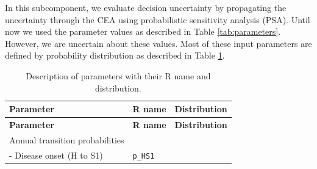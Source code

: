 \documentclass[]{book}
\begin{document}
In this subcomponent, we evaluate decision uncertainty by propagating
the uncertainty through the CEA using probabilistic sensitivity analysis
(PSA). Until now we used the parameter values as described in Table
\ref{tab:parameters}. However, we are uncertain about these values. Most
of these input parameters are defined by probability distribution as
described in Table \ref{tab:parameters-PSA}.

\begin{longtable}[]{@{}lll@{}}
\caption{\label{tab:parameters-PSA} Description of parameters with their R
name and distribution.}\tabularnewline
\toprule
\begin{minipage}[b]{0.33\columnwidth}\raggedright\strut
\textbf{Parameter}\strut
\end{minipage} & \begin{minipage}[b]{0.13\columnwidth}\raggedright\strut
\textbf{R name}\strut
\end{minipage} & \begin{minipage}[b]{0.45\columnwidth}\raggedright\strut
\textbf{Distribution}\strut
\end{minipage}\tabularnewline
\midrule
\endfirsthead
\toprule
\begin{minipage}[b]{0.33\columnwidth}\raggedright\strut
\textbf{Parameter}\strut
\end{minipage} & \begin{minipage}[b]{0.13\columnwidth}\raggedright\strut
\textbf{R name}\strut
\end{minipage} & \begin{minipage}[b]{0.45\columnwidth}\raggedright\strut
\textbf{Distribution}\strut
\end{minipage}\tabularnewline
\midrule
\endhead
\begin{minipage}[t]{0.33\columnwidth}\raggedright\strut
Annual transition probabilities\strut
\end{minipage} & \begin{minipage}[t]{0.13\columnwidth}\raggedright\strut
\strut
\end{minipage} & \begin{minipage}[t]{0.45\columnwidth}\raggedright\strut
\strut
\end{minipage}\tabularnewline
\begin{minipage}[t]{0.33\columnwidth}\raggedright\strut
- Disease onset (H to S1)\strut
\end{minipage} & \begin{minipage}[t]{0.13\columnwidth}\raggedright\strut
\texttt{p\_HS1}\strut

\end{minipage}
\end{longtable}
\end{document}
